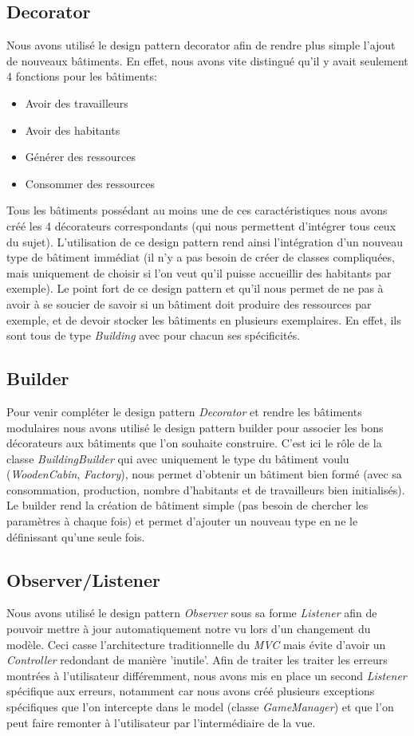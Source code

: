 \documentclass{article}
\begin{document}
\subsection{Decorator}
Nous avons utilisé le design pattern decorator afin de rendre plus simple l'ajout de nouveaux bâtiments.
En effet, nous avons vite distingué qu'il y avait seulement 4 fonctions pour les bâtiments:
\begin{itemize}
    \item Avoir des travailleurs
    \item Avoir des habitants
    \item Générer des ressources
    \item Consommer des ressources
\end{itemize}
Tous les bâtiments possédant au moins une de ces caractéristiques nous avons créé les 4 décorateurs correspondants
(qui nous permettent d'intégrer tous ceux du sujet). L'utilisation de ce design pattern rend ainsi l'intégration
d'un nouveau type de bâtiment immédiat (il n'y a pas besoin de créer de classes compliquées, mais uniquement de choisir
si l'on veut qu'il puisse accueillir des habitants par exemple). Le point fort de ce design pattern et qu'il nous permet
de ne pas à avoir à se soucier de savoir si un bâtiment doit produire des ressources par exemple, et de devoir stocker les
bâtiments en plusieurs exemplaires. En effet, ils sont tous de type \textit{Building} avec pour chacun ses spécificités.

\subsection{Builder}
Pour venir compléter le design pattern \textit{Decorator} et rendre les bâtiments modulaires nous avons utilisé le design
pattern builder pour associer les bons décorateurs aux bâtiments que l'on souhaite construire. C'est ici le rôle de la
classe \textit{BuildingBuilder} qui avec uniquement le type du bâtiment voulu (\textit{WoodenCabin}, \textit{Factory}), 
nous permet d'obtenir un bâtiment bien formé (avec sa consommation, production, nombre d'habitants et de travailleurs bien 
initialisés). Le builder rend la création de bâtiment simple (pas besoin de chercher les paramètres à chaque fois) et permet 
d'ajouter un nouveau type en ne le définissant qu'une seule fois.

\subsection{Observer/Listener}
Nous avons utilisé le design pattern \textit{Observer} sous sa forme \textit{Listener} afin de pouvoir mettre à jour automatiquement
notre vu lors d'un changement du modèle. Ceci casse l'architecture traditionnelle du \textit{MVC} mais évite d'avoir un \textit{Controller}
redondant de manière 'inutile'. Afin de traiter les traiter les erreurs montrées à l'utilisateur différemment, nous avons mis en place
un second \textit{Listener} spécifique aux erreurs, notamment car nous avons créé plusieurs exceptions spécifiques que l'on intercepte
dans le model (classe \textit{GameManager}) et que l'on peut faire remonter à l'utilisateur par l'intermédiaire de la vue.
\end{document}
